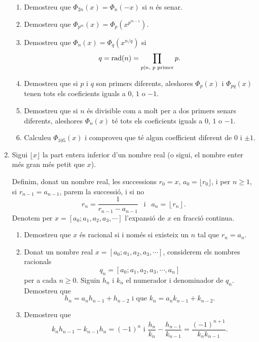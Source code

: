 \begin{enumerate}[leftmargin=*]
\begin{enumerate}

\item   Demostreu que $\Phi_{2n}(x)=\Phi_n(-x)$ si $n$ és
senar.

\item  Demostreu que $\Phi_{p^m}(x)=\Phi_p(x^{p^{m-1}})$.

\item  Demostreu que $\Phi_{n}(x)=\Phi_q(x^{n/q})$ si
$$q=\mbox{rad}(n)=\prod_{p\mid n, \mbox{\scriptsize{ $p$ primer}}}
p.$$

\item  Demostreu que si $p$ i $q$ son primers diferents,
aleshores $\Phi_{p}(x)$ i $\Phi_{pq}(x)$ tenen tots els coeficients
iguals a $0$, $1$ o $-1$.

\item  Demostreu que si $n$ és divisible com a molt per a dos
primers senars diferents, aleshores $\Phi_{n}(x)$ té tots els
coeficients iguals a $0$, $1$ o $-1$.

\item  Calculeu $\Phi_{105}(x)$ i comproveu que té algun
coefficient diferent de $0$ i $\pm 1$.

\end{enumerate}

\item Sigui $\lfloor x \rfloor$ la part entera inferior d'un
nombre real (o sigui, el nombre enter més gran més petit que $x$).

Definim, donat un nombre real, les successions $r_0=x$,
$a_0=\lfloor r_0 \rfloor$,  i per $n\ge 1$, si $r_{n-1}= a_{n-1}$,
parem la successió, i si no
$$ r_n=\frac 1{r_{n-1}-a_{n-1}} \ \  \mbox{ i } \ \  a_n=\left\lfloor r_n \right\rfloor.$$ Denotem per
$x= [a_0;a_1,a_2,a_3,\cdots]$ l'expansió de $x$ en fracció
continua.

\begin{enumerate}

\item  Demostreu que $x$ és racional si i només si existeix un
$n$ tal que $r_n=a_n$.

\item  Donat un nombre real $x=[a_0;a_1,a_2,a_3,\cdots]$,
considerem els nombres racionals
$$q_n=[a_0;a_1,a_2,a_3,\cdots,a_n]$$ per a cada $n\ge 0$. Siguin
$h_n$ i $k_n$ el numerador i denominador de $q_n$. Demostreu que
$$h_n=a_nh_{n-1}+ h_{n-2} \mbox{ i que } k_n=a_nk_{n - 1} + k_{n - 2}.$$

\item  Demostreu que
$$k_nh_{n-1}-k_{n-1}h_n=(-1)^n \mbox{ i } \frac{h_n}{k_n}-\frac{h_{n-1}}{k_{n-1}}
= \frac{(-1)^{n+1}}{k_nk_{n-1}}.$$


\end{enumerate}
\end{enumerate}

